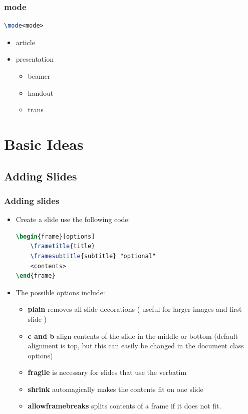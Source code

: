 \documentclass[11pt,pdf,aspectratio=43]{beamer}
\begin{document}
\begin{frame}[fragile]
    \frametitle{mode}

    \begin{lstlisting}[language=TeX]
\mode<mode>
    \end{lstlisting}
    \begin{itemize}
	\item article
	\item presentation
	    \begin{itemize}
		\item beamer
		\item handout
		\item trans
	    \end{itemize}
    \end{itemize}
\end{frame}

\section{Basic Ideas}
\label{sec:basic ideas}

\subsection*{Adding Slides}
\newenvironment{slide}
    {\begin{frame}[fragile,environment=slide]}
    {\end{frame}}

\begin{slide}
    \frametitle{Adding slides}
    \begin{itemize}
	\item Create a slide use the following code: \\
	\begin{lstlisting}[language=TeX]
\begin{frame}[options]
    \frametitle{title}
    \framesubtitle{subtitle} "optional" 
	<contents> 
\end{frame}
	\end{lstlisting}
	\item The possible options include: \\
	    \begin{itemize}
		\item \textbf{plain} removes all slide decorations ( useful for larger images and first slide )
		\item \textbf{c and b} align contents of the slide in the middle or bottom (default alignment is top,
		    but this can easily be changed in the document class options)
		\item \textbf{fragile} is necessary for slides that use the verbatim
		\item \textbf{shrink} automagically makes the contents fit on one slide
		\item \textbf{allowframebreaks} splits contents of a frame if it does not fit.
	    \end{itemize}
    \end{itemize}
\end{slide}
\end{document}
